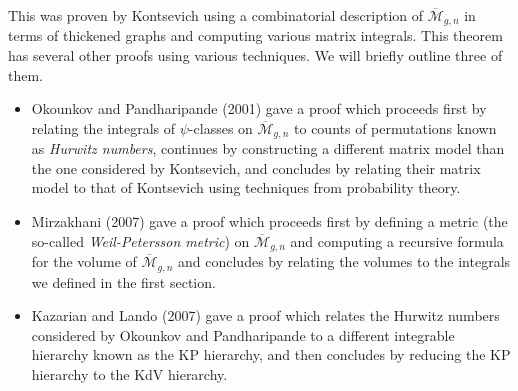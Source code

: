 \documentclass{amsart}
\theoremstyle{definition}
\theoremstyle{remark}
\theoremstyle{plain}
\theoremstyle{definition}
\theoremstyle{remark}
\newcommand{\Mbar}{\overline{\mathcal{M}}}
\newcommand{\1}{\mathbf{1}}
\newcommand{\2}{\mathbf{2}}
\newcommand{\3}{\mathbf{3}}
\begin{document}
This was proven by Kontsevich using a combinatorial description of $\Mbar_{g,n}$ in terms of thickened graphs and computing various matrix integrals. This theorem has several other proofs using various techniques. We will briefly outline three of them.
\begin{itemize}
    \item Okounkov and Pandharipande (2001) gave a proof which proceeds first by relating the integrals of $\psi$-classes on $\Mbar_{g,n}$ to counts of permutations known as \textit{Hurwitz numbers}, continues by constructing a different matrix model than the one considered by Kontsevich, and concludes by relating their matrix model to that of Kontsevich using techniques from probability theory.
    \item Mirzakhani (2007) gave a proof which proceeds first by defining a metric (the so-called \textit{Weil-Petersson metric}) on $\Mbar_{g,n}$ and computing a recursive formula for the volume of $\Mbar_{g,n}$ and concludes by relating the volumes to the integrals we defined in the first section.
    \item Kazarian and Lando (2007) gave a proof which relates the Hurwitz numbers considered by Okounkov and Pandharipande to a different integrable hierarchy known as the KP hierarchy, and then concludes by reducing the KP hierarchy to the KdV hierarchy.
\end{itemize}
\end{document}
